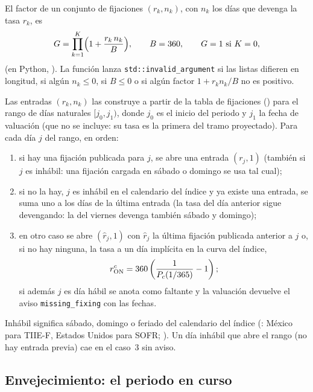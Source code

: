 El factor de un conjunto de fijaciones $(r_k,n_k)$, con $n_k$ los días que devenga la tasa $r_k$, es
\begin{equation}\label{eq:cap03-factor}
  G=\prod_{k=1}^{K}\Bigl(1+\frac{r_k\,n_k}{B}\Bigr),\qquad B=360,\qquad G=1\ \text{si } K=0 ,
\end{equation}
 (en Python,
). La función lanza
\texttt{std::invalid\_argument} si las listas difieren en longitud, si algún $n_k\le0$, si $B\le0$ o si algún
factor $1+r_kn_k/B$ no es positivo.

Las entradas $(r_k,n_k)$ las construye  a partir de la tabla de
fijaciones () para el rango de días naturales $[j_0,j_1)$, donde $j_0$
es el inicio del periodo y $j_1$ la fecha de valuación (que no se incluye: su tasa es la primera del tramo
proyectado). Para cada día $j$ del rango, en orden:
\begin{enumerate}
  \item si hay una fijación publicada para $j$, se abre una entrada $(r_j,1)$ (también si $j$ es inhábil: una
        fijación cargada en sábado o domingo se usa tal cual);
  \item si no la hay, $j$ es inhábil en el calendario del índice y ya existe una entrada, se suma uno a los
        días de la última entrada (la tasa del día anterior sigue devengando: la del viernes devenga también
        sábado y domingo);
  \item en otro caso se abre $(\hat r_j,1)$ con $\hat r_j$ la última fijación publicada anterior a $j$ o, si
        no hay ninguna, la tasa a un día implícita en la curva del índice,
        \begin{equation}\label{eq:cap03-tasa-curva}
          r^{c}_{\mathrm{ON}}=360\left(\frac{1}{P_{c}(1/365)}-1\right);
        \end{equation}
        si además $j$ es día hábil se anota como faltante y la valuación devuelve el aviso
        \texttt{missing\_fixing} con las fechas.
\end{enumerate}
Inhábil significa sábado, domingo o feriado del calendario del índice
(: México para TIIE-F, Estados Unidos para SOFR;
). Un día inhábil que abre el rango (no hay entrada previa) cae en
el caso~3 sin aviso.

\subsection{Envejecimiento: el periodo en curso}\label{sec:cap03-envejecimiento}

